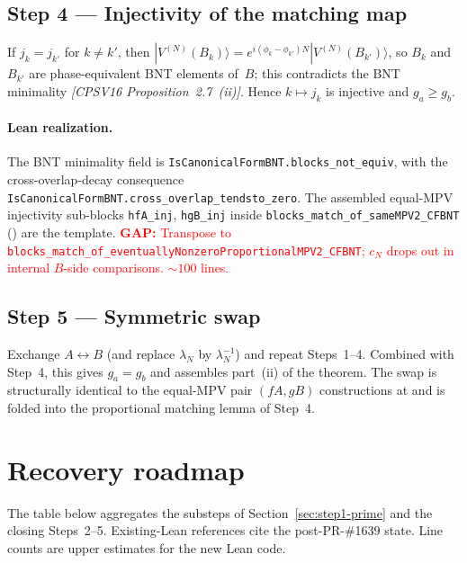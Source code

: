 \documentclass{article}
\newcommand{\leanid}[1]{\texttt{#1}}
\newcommand{\paperref}[1]{\textit{[CPSV16 #1]}}
\newcommand{\gap}[1]{\textcolor{red}{\textbf{GAP:} #1}}
\theoremstyle{plain}
\begin{document}
\subsection{Step 4 --- Injectivity of the matching map}
\label{sec:step4}

If $j_k = j_{k'}$ for $k \neq k'$, then $|V^{(N)}(B_k)\rangle =
    e^{i(\phi_k - \phi_{k'})N}|V^{(N)}(B_{k'})\rangle$, so $B_k$ and
$B_{k'}$ are phase-equivalent BNT elements of~$B$; this contradicts
the BNT minimality \paperref{Proposition~2.7~(ii)}. Hence
$k \mapsto j_k$ is injective and $g_a \ge g_b$.

\paragraph{Lean realization.}
The BNT minimality field is
\leanid{IsCanonicalFormBNT.blocks\_not\_equiv}, with the
cross-overlap-decay consequence
\leanid{IsCanonicalFormBNT.cross\_overlap\_tendsto\_zero}. The
assembled equal-MPV injectivity sub-blocks \leanid{hfA\_inj},
\leanid{hgB\_inj} inside \leanid{blocks\_match\_of\_sameMPV2\_CFBNT}
() are the template.
\gap{Transpose to \leanid{blocks\_match\_of\_eventuallyNonzeroProportionalMPV2\_CFBNT};
    $c_N$ drops out in internal $B$-side comparisons. $\sim 100$ lines.}

\subsection{Step 5 --- Symmetric swap}
\label{sec:step5}

Exchange $A \leftrightarrow B$ (and replace $\lambda_N$ by
$\lambda_N^{-1}$) and repeat Steps~1--4. Combined with Step~4, this
gives $g_a = g_b$ and assembles part~(ii) of the theorem. The
swap is structurally identical to the equal-MPV pair $(fA, gB)$
constructions at  and is folded
into the proportional matching lemma of Step~4.

\section{Recovery roadmap}
\label{sec:roadmap}

The table below aggregates the substeps of Section~\ref{sec:step1-prime}
and the closing Steps~2--5. Existing-Lean references cite the
post-PR-\#1639 state. Line counts are upper estimates for the new Lean
code.
\end{document}
